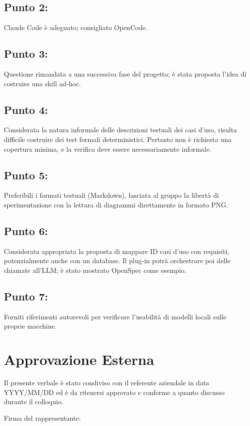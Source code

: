 \documentclass[a4paper, 11pt]{article}
\begin{document}
\subsection{Punto 2:}
Claude Code è adeguato; consigliato OpenCode.
\subsection{Punto 3:}
Questione rimandata a una successiva fase del progetto; è stata proposta l'idea di costruire una skill ad-hoc.
\subsection{Punto 4:}
Considerata la natura informale delle descrizioni testuali dei casi d'uso, risulta difficile costruire dei test formali deterministici. Pertanto non è richiesta una copertura minima, e la verifica deve essere necessariamente informale.
\subsection{Punto 5:}
Preferibili i formati testuali (Markdown), lasciata al gruppo la libertà di sperimentazione con la lettura di diagrammi direttamente in formato PNG.
\subsection{Punto 6:}
Considerata appropriata la proposta di mappare ID casi d'uso con requisiti, potenzialmente anche con un database. Il plug-in potrà orchestrare poi delle chiamate all'LLM; è stato mostrato OpenSpec come esempio.
\subsection{Punto 7:}
Forniti riferimenti autorevoli per verificare l'usabilità di modelli locali sulle proprie macchine.
\newpage


\section{Approvazione Esterna}

Il presente verbale è stato condiviso con il referente aziendale in data YYYY/MM/DD ed è da ritenersi approvato e conforme a quanto discusso durante il colloquio. 

\vspace{3cm}
Firma del rappresentante:
\end{document}
